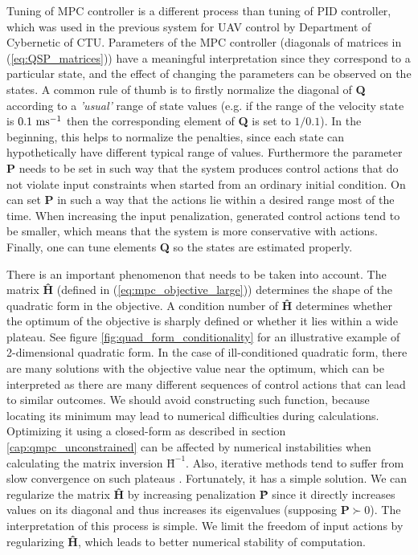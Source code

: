 Tuning of MPC controller is a different process than tuning of PID controller, which was used in the previous system for UAV control by Department of Cybernetic of CTU. Parameters of the MPC controller (diagonals of matrices in (\ref{eq:QSP_matrices})) have a meaningful interpretation since they correspond to a particular state, and the effect of changing the parameters can be observed on the states. A common rule of thumb is to firstly normalize the diagonal of \textbf{Q} according to a \textit{'usual'} range of state values (e.g. if the range of the velocity state is $0.1~\mathrm{ms^{-1}}$ then the corresponding element of \textbf{Q} is set to $1/0.1$). In the beginning, this helps to normalize the penalties, since each state can hypothetically have different typical range of values. Furthermore the parameter \textbf{P} needs to be set in such way that the system produces control actions that do not violate input constraints when started from an ordinary initial condition. On can set \textbf{P} in such a way that the actions lie within a desired range most of the time. When increasing the input penalization, generated control actions tend to be smaller, which means that the system is more conservative with actions. Finally, one can tune elements \textbf{Q} so the states are estimated properly.

There is an important phenomenon that needs to be taken into account. The matrix \textbf{\^H} (defined in (\ref{eq:mpc_objective_large})) determines the shape of the quadratic form in the objective. A condition number of \textbf{\^H} determines whether the optimum of the objective is sharply defined or whether it lies within a wide plateau. See figure \ref{fig:quad_form_conditionality} for an illustrative example of 2-dimensional quadratic form. In the case of ill-conditioned quadratic form, there are many solutions with the objective value near the optimum, which can be interpreted as there are many different sequences of control actions that can lead to similar outcomes. We should avoid constructing such function, because locating its minimum may lead to numerical difficulties during calculations. Optimizing it using a closed-form as described in section \ref{cap:qmpc_unconstrained} can be affected by numerical instabilities when calculating the matrix inversion $\textbf{\^H}^{-1}$. Also, iterative methods tend to suffer from slow convergence on such plateaus \citep{boyd2004convex}. Fortunately, it has a simple solution. We can regularize the matrix \textbf{\^H} by increasing penalization \textbf{\^P} since it directly increases values on its diagonal and thus increases its eigenvalues (supposing $\textbf{\^P} \succ 0$). The interpretation of this process is simple. We limit the freedom of input actions by regularizing \textbf{\^H}, which leads to better numerical stability of computation.

